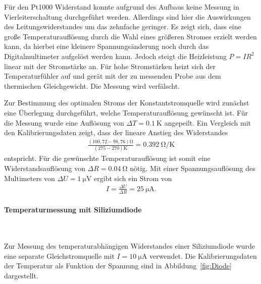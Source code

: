 \documentclass[parskip=half, a4paper,twoside,final]{article}
\begin{document}


Für den Pt1000 Widerstand konnte aufgrund des Aufbaus keine Messung in Vierleiterschaltung durchgeführt werden. Allerdings sind hier die Auswirkungen des Leitungswiderstandes um das zehnfache geringer. Es zeigt sich, dass eine große Temperaturauflösung durch die Wahl eines größeren Stromes erzielt werden kann, da hierbei eine kleinere Spannungsänderung noch durch das Digitalmultimeter aufgelöst werden kann. Jedoch steigt die Heizleistung $P = I R^2$ linear mit der Stromstärke an. Für hohe Stromstärken heizt sich der Temperaturfühler auf und gerät mit der zu messenden Probe aus dem thermischen Gleichgewicht. Die Messung wird verfälscht.

Zur Bestimmung des optimalen Stroms der Konstantstromquelle wird zunächst eine Überlegung durchgeführt, welche Temperaturauflösung gewünscht ist. Für die Messung wurde eine Auflösung von $\Delta T = \SI{0.1}{\kelvin}$ angepeilt. Ein Vergleich mit den Kalibrierungsdaten zeigt, dass der lineare Anstieg des Widerstandes
\begin{align}
  \frac{(100,72-98,76)\si{\ohm}}{(275-270)\si{\kelvin}} = \SI{0.392}{\ohm\per\kelvin}
\end{align}
entspricht. Für die gewünschte Temperaturauflösung ist somit eine Widerstandsauflösung von $\Delta R = \SI{0.04}{\ohm}$ nötig. Mit einer Spannungsauflösung des Multimeters von $\Delta U = \SI{1}{\micro\volt}$ ergibt sich ein Strom von
\begin{align}
  I = \frac{\Delta U}{\Delta R} = \SI{25}{\micro\ampere}.
\end{align}

\paragraph{Temperaturmessung mit Siliziumdiode}$~$

Zur Messung des temperaturabhängigen Widerstandes einer Siliziumdiode wurde eine separate Gleichstromquelle mit $I = \SI{10}{\micro\ampere}$ verwendet. Die Kalibrierungsdaten der Temperatur als Funktion der Spannung sind in Abbildung~\ref{fig:Diode} dargestellt.


\end{document}
